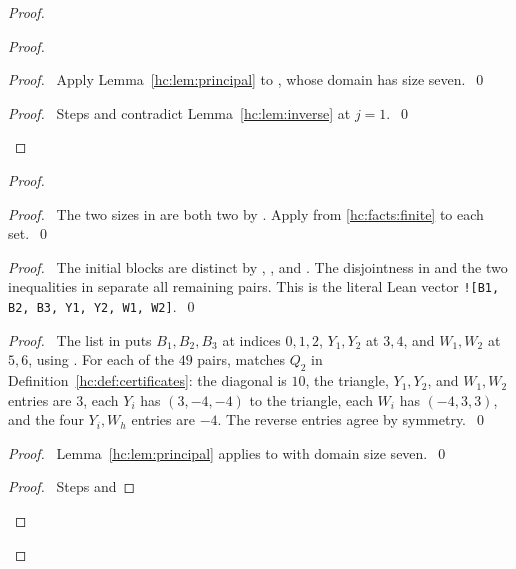 \begin{mergedproofsection}
\begin{proof}
\begin{proof}
  \begin{proof}\pf\ Apply Lemma~\ref{hc:lem:principal} to
   , whose domain has size seven.~\qed\end{proof}
  \qedstep
  \begin{proof}\pf\ Steps  and
    contradict Lemma~\ref{hc:lem:inverse} at $j=1$.~\qed\end{proof}
 \end{proof}
 \begin{proof}
  \begin{proof}\pf\ The two sizes in  are
   both two by . Apply  from
   \ref{hc:facts:finite} to each set.~\qed\end{proof}
  \begin{proof}\pf\ The initial blocks are distinct by
   , , and .
   The disjointness in  and the two inequalities
   in  separate all remaining pairs.
   This is the literal Lean vector \texttt{![B1, B2, B3, Y1, Y2, W1, W2]}.~\qed\end{proof}
  \begin{proof}\pf\ The list in  puts
   $B_1,B_2,B_3$ at indices $0,1,2$, $Y_1,Y_2$ at $3,4$, and
   $W_1,W_2$ at $5,6$, using .
   For each of the $49$ pairs,  matches
   $Q_2$ in Definition~\ref{hc:def:certificates}: the diagonal is
   $10$, the triangle, $Y_1,Y_2$, and $W_1,W_2$ entries are $3$,
   each $Y_i$ has $(3,-4,-4)$ to the triangle, each $W_i$ has
   $(-4,3,3)$, and the four $Y_i,W_h$ entries are $-4$.
   The reverse entries agree by symmetry.~\qed\end{proof}
  \begin{proof}\pf\ Lemma~\ref{hc:lem:principal} applies to
    with domain size seven.~\qed\end{proof}
  \qedstep
  \begin{proof}\pf\ Steps  and

\end{proof}
\end{proof}
\end{proof}
\end{mergedproofsection}

